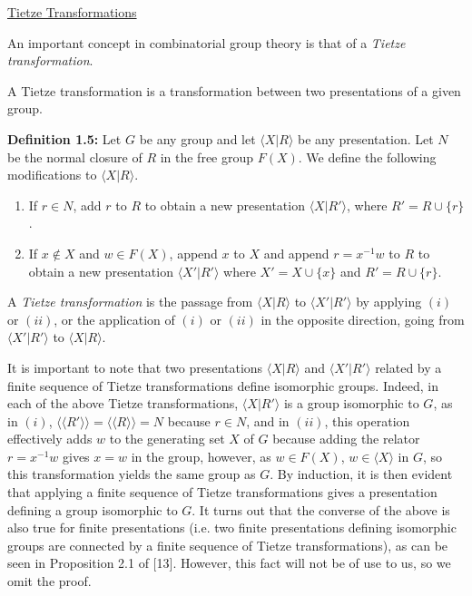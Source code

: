 \documentclass[12pt]{article}
\newcommand{\vs}{\vskip10pt}
\begin{document}
	\underline{Tietze Transformations}
	
	\vs
	
	An important concept in combinatorial group theory is that of a \textit{Tietze transformation}. 
	
	\vs 
	
	A Tietze transformation is a transformation between two presentations of a given group. 
	
	\vs
	
	\textbf{Definition 1.5: } Let $G$ be any group and let $\langle X \vert R \rangle $ be any presentation. Let $N$ be the normal closure of $R$ in the free group $F(X)$. We define the following modifications to $\langle X \vert R \rangle $. 
	
	\begin{enumerate}[label = (\roman*)]
		\item If $r \in N$, add $r$ to $R$ to obtain a new presentation $\langle X \vert R' \rangle$, where $R' = R \cup \{r\}$. 
		\item If $x \notin X$ and $w \in F(X)$, append $x$ to $X$ and append $r = x^{-1}w$ to $R$ to obtain a new presentation $\langle X' \vert R' \rangle$ where $X' = X \cup \{x\}$ and $R' = R \cup \{r\}$. 
	\end{enumerate}

	A \textit{Tietze transformation} is the passage from $\langle X \vert R \rangle$ to $\langle X' \vert R' \rangle$ by applying $(i)$ or $(ii)$, or the application of $(i)$ or $(ii)$ in the opposite direction, going from $\langle X' \vert R' \rangle$ to $\langle X \vert R \rangle$.
	
	\vs

	It is important to note that two presentations $\langle X \vert R \rangle$ and $\langle X' \vert R' \rangle$ related by a finite sequence of Tietze transformations define isomorphic groups. Indeed, in each of the above Tietze transformations, $\langle X \vert R' \rangle$ is a group isomorphic to $G$, as in $(i)$, $\langle \langle R' \rangle \rangle = \langle \langle R \rangle \rangle = N$ because $r \in N$, and in $(ii)$, this operation effectively adds $w$ to the generating set $X$ of $G$ because adding the relator $r = x^{-1}w$ gives $x = w$ in the group, however, as $w \in F(X)$, $w \in \langle X \rangle$ in $G$, so this transformation yields the same group as $G$. By induction, it is then evident that applying a finite sequence of Tietze transformations gives a presentation defining a group isomorphic to $G$. It turns out that the converse of the above is also true for finite presentations (i.e. two finite presentations defining isomorphic groups are connected by a finite sequence of Tietze transformations), as can be seen in Proposition 2.1 of [13]. However, this fact will not be of use to us, so we omit the proof. 
	
\end{document}
